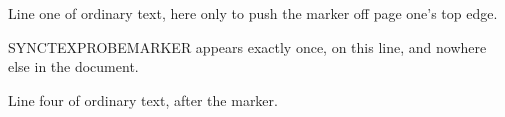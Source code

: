 \documentclass{article}
\begin{document}
Line one of ordinary text, here only to push the marker off page one's top edge.

SYNCTEXPROBEMARKER appears exactly once, on this line, and nowhere else in the document.

Line four of ordinary text, after the marker.
\end{document}
